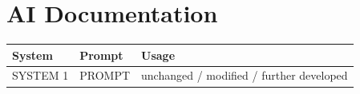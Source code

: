 \section*{AI Documentation}

\begin{tabular}{|p{}|p{}|p{}|}
    \hline
    \rowcolor{gray!30}
    \textbf{System} & \textbf{Prompt} & \textbf{Usage} \\
    \hline
    SYSTEM 1 & PROMPT & unchanged / modified / further developed \\
    \hline
\end{tabular}
